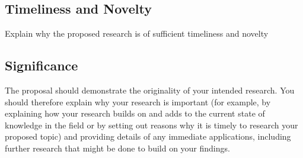 %
%


\subsection{Timeliness and Novelty}

Explain why the proposed research is of sufficient timeliness and novelty

\subsection{Significance}

The proposal should demonstrate the originality of your intended research. You should therefore explain why your research is important (for example, by explaining how your research builds on and adds to the current state of knowledge in the field or by setting out reasons why it is timely to research your proposed topic) and providing details of any immediate applications, including further research that might be done to build on your findings.

